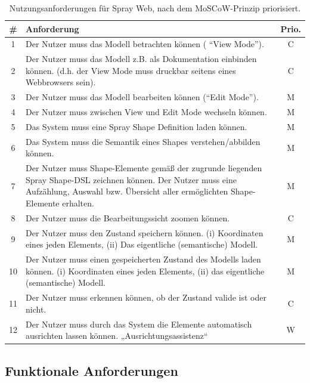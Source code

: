 \begin{table}[tbp]
  \begin{tabular}{ | c | p{10cm} | c | }
    \hline
    \# & Anforderung & Prio. \\ \hline \hline
    1  & Der Nutzer muss das Modell betrachten können ( “View Mode”). & C \\ \hline
    2  & Der Nutzer muss das Modell z.B. als Dokumentation einbinden können. (d.h. der View Mode muss druckbar seitens eines Webbrowsers sein). & C \\ \hline
    3  & Der Nutzer muss das Modell bearbeiten können (“Edit Mode”). & M \\ \hline
    4  & Der Nutzer muss zwischen View und Edit Mode wechseln können. & M \\ \hline
    5  & Das System muss eine Spray Shape Definition laden können. & M \\ \hline
    6  & Das System muss die Semantik eines Shapes verstehen/abbilden können. & M \\ \hline
    7  & Der Nutzer muss Shape-Elemente gemäß der zugrunde liegenden Spray Shape-DSL zeichnen können. Der Nutzer muss eine Aufzählung, Auswahl bzw. Übersicht aller ermöglichten Shape-Elemente erhalten. & M \\ \hline
    8  & Der Nutzer muss die Bearbeitungssicht zoomen können. & C \\ \hline
    9  & Der Nutzer muss den Zustand speichern können. (i) Koordinaten eines jeden Elements, (ii) Das eigentliche (semantische) Modell. & M \\ \hline
    10 & Der Nutzer muss einen gespeicherten Zustand des Modells laden können.
(i) Koordinaten eines jeden Elements, (ii)
das eigentliche (semantische) Modell. & M \\ \hline
    11 & Der Nutzer muss erkennen können, ob der Zustand valide ist oder nicht. & C \\ \hline
    12 & Der Nutzer muss durch das System die Elemente automatisch ausrichten lassen können. „Ausrichtungsassistenz“ & W \\
    \hline  
  \end{tabular}
  \caption{Nutzungsanforderungen für Spray Web,
           nach dem MoSCoW-Prinzip priorisiert.}\label{tbl.nutz}
\end{table}

\subsection{Funktionale Anforderungen}

